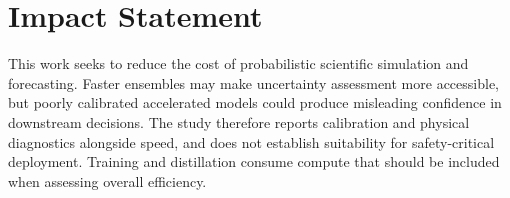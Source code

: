 \section*{Impact Statement}
This work seeks to reduce the cost of probabilistic scientific simulation and forecasting. Faster ensembles may make uncertainty assessment more accessible, but poorly calibrated accelerated models could produce misleading confidence in downstream decisions. The study therefore reports calibration and physical diagnostics alongside speed, and does not establish suitability for safety-critical deployment. Training and distillation consume compute that should be included when assessing overall efficiency.

